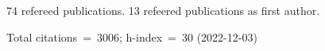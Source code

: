 74 refereed publications. 13 refeered publications as first author.

Total citations~=~3006; h-index~=~30 (2022-12-03)